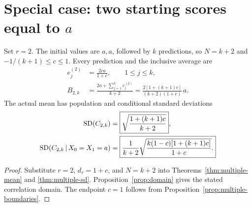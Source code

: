\section{Special case: two starting scores equal to \texorpdfstring{\(a\)}{a}}
\begin{corollary}
\label{cor:two-starts}
Set \(r=2\). The initial values are \(a,a\), followed by \(k\)
predictions, so \(N=k+2\) and \(-1/(k+1)\leq c\leq1\). Every prediction
and the inclusive average are
\begin{align}
  e_j^{(2)}&=\boxed{\frac{2ca}{1+c}},\qquad 1\leq j\leq k,
    \label{eq:two-predictions}\\
  B_{2,k}&=\frac{2a+\sum_{j=1}^{k}e_j^{(2)}}{k+2}
    =\boxed{\frac{2[1+(k+1)c]}{(k+2)(1+c)}\,a.}
    \label{eq:two-mean}
\end{align}
The actual mean has population and conditional standard deviations
\begin{align}
  \operatorname{SD}(C_{2,k})
    &=\boxed{\sqrt{\frac{1+(k+1)c}{k+2}}},
      \label{eq:two-population-sd}\\
  \operatorname{SD}(C_{2,k}\,\vert\, X_0=X_1=a)
    &=\boxed{\frac1{k+2}
       \sqrt{\frac{k(1-c)[1+(k+1)c]}{1+c}}.}
      \label{eq:two-conditional-sd}
\end{align}
\end{corollary}
\begin{proof}
Substitute \(r=2\), \(d_r=1+c\), and \(N=k+2\) into
Theorems~\ref{thm:multiple-mean} and \ref{thm:multiple-sd}.
Proposition~\ref{prop:domain} gives the stated correlation domain.
The endpoint \(c=1\) follows from Proposition~\ref{prop:multiple-boundaries}.
\end{proof}

